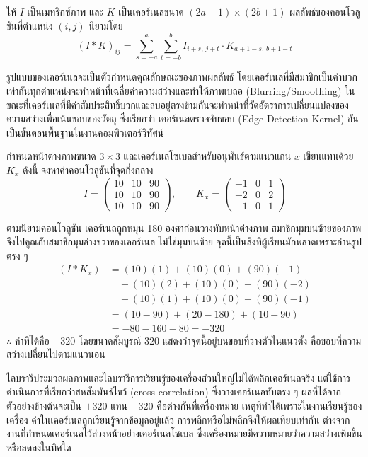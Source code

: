 \begin{definition}
ให้ $I$ เป็นเมทริกซ์ภาพ และ $K$ เป็นเคอร์เนลขนาด $(2a+1) \times (2b+1)$ ผลลัพธ์ของคอนโวลูชันที่ตำแหน่ง $(i,j)$ นิยามโดย
\[ (I * K)_{ij} = \sum_{s=-a}^{a} \sum_{t=-b}^{b} I_{i+s,\, j+t} \cdot K_{a+1-s,\, b+1-t} \]
\end{definition}

รูปแบบของเคอร์เนลจะเป็นตัวกำหนดคุณลักษณะของภาพผลลัพธ์ โดยเคอร์เนลที่มีสมาชิกเป็นค่าบวกเท่ากันทุกตำแหน่งจะทำหน้าที่เฉลี่ยค่าความสว่างและทำให้ภาพเบลอ (Blurring/Smoothing) ในขณะที่เคอร์เนลที่มีค่าสัมประสิทธิ์บวกและลบอยู่ตรงข้ามกันจะทำหน้าที่วัดอัตราการเปลี่ยนแปลงของความสว่างเพื่อเน้นขอบของวัตถุ ซึ่งเรียกว่า เคอร์เนลตรวจจับขอบ (Edge Detection Kernel) อันเป็นขั้นตอนพื้นฐานในงานคอมพิวเตอร์วิทัศน์

\begin{ex}
\label{ex:sobel-convolution}
กำหนดหน้าต่างภาพขนาด $3 \times 3$ และเคอร์เนลโซเบลสำหรับอนุพันธ์ตามแนวแกน $x$ เขียนแทนด้วย $K_x$ ดังนี้ จงหาค่าคอนโวลูชันที่จุดกึ่งกลาง
\[ I = \begin{pmatrix} 10 & 10 & 90 \\ 10 & 10 & 90 \\ 10 & 10 & 90 \end{pmatrix}, \qquad K_x = \begin{pmatrix} -1 & 0 & 1 \\ -2 & 0 & 2 \\ -1 & 0 & 1 \end{pmatrix} \]
\end{ex}
\begin{solution}
ตามนิยามคอนโวลูชัน เคอร์เนลถูกหมุน 180 องศาก่อนวางทับหน้าต่างภาพ สมาชิกมุมบนซ้ายของภาพจึงไปคูณกับสมาชิกมุมล่างขวาของเคอร์เนล ไม่ใช่มุมบนซ้าย จุดนี้เป็นสิ่งที่ผู้เรียนมักพลาดเพราะอ่านรูปตรง ๆ
\begin{align*}
(I * K_x) &= (10)(1) + (10)(0) + (90)(-1)\\
&\quad + (10)(2) + (10)(0) + (90)(-2)\\
&\quad + (10)(1) + (10)(0) + (90)(-1)\\
&= (10 - 90) + (20 - 180) + (10 - 90)\\
&= -80 - 160 - 80 = -320
\end{align*}
$\therefore$ ค่าที่ได้คือ $-320$ โดยขนาดสัมบูรณ์ $320$ แสดงว่าจุดนี้อยู่บนขอบที่วางตัวในแนวตั้ง คือขอบที่ความสว่างเปลี่ยนไปตามแนวนอน \solhere
\end{solution}

\begin{rem}
\label{rem:convolution-vs-correlation}
ไลบรารีประมวลผลภาพและไลบรารีการเรียนรู้ของเครื่องส่วนใหญ่ไม่ได้พลิกเคอร์เนลจริง แต่ใช้การดำเนินการที่เรียกว่าสหสัมพันธ์ไขว้ (cross-correlation) ซึ่งวางเคอร์เนลทับตรง ๆ ผลที่ได้จากตัวอย่างข้างต้นจะเป็น $+320$ แทน $-320$ คือต่างกันที่เครื่องหมาย เหตุที่ทำได้เพราะในงานเรียนรู้ของเครื่อง ค่าในเคอร์เนลถูกเรียนรู้จากข้อมูลอยู่แล้ว การพลิกหรือไม่พลิกจึงให้ผลเทียบเท่ากัน ต่างจากงานที่กำหนดเคอร์เนลไว้ล่วงหน้าอย่างเคอร์เนลโซเบล ซึ่งเครื่องหมายมีความหมายว่าความสว่างเพิ่มขึ้นหรือลดลงในทิศใด
\end{rem}

